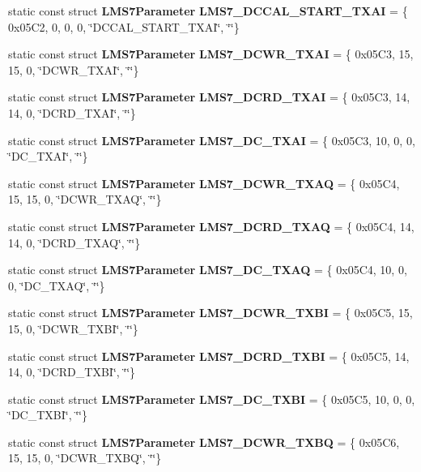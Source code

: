 \begin{DoxyCompactItemize}
\item 
static const struct {\bf L\+M\+S7\+Parameter} {\bf L\+M\+S7\+\_\+\+D\+C\+C\+A\+L\+\_\+\+S\+T\+A\+R\+T\+\_\+\+T\+X\+AI} = \{ 0x05\+C2, 0, 0, 0, \char`\"{}\+D\+C\+C\+A\+L\+\_\+\+S\+T\+A\+R\+T\+\_\+\+T\+X\+A\+I\char`\"{}, \char`\"{}\char`\"{}\}
\item 
static const struct {\bf L\+M\+S7\+Parameter} {\bf L\+M\+S7\+\_\+\+D\+C\+W\+R\+\_\+\+T\+X\+AI} = \{ 0x05\+C3, 15, 15, 0, \char`\"{}\+D\+C\+W\+R\+\_\+\+T\+X\+A\+I\char`\"{}, \char`\"{}\char`\"{}\}
\item 
static const struct {\bf L\+M\+S7\+Parameter} {\bf L\+M\+S7\+\_\+\+D\+C\+R\+D\+\_\+\+T\+X\+AI} = \{ 0x05\+C3, 14, 14, 0, \char`\"{}\+D\+C\+R\+D\+\_\+\+T\+X\+A\+I\char`\"{}, \char`\"{}\char`\"{}\}
\item 
static const struct {\bf L\+M\+S7\+Parameter} {\bf L\+M\+S7\+\_\+\+D\+C\+\_\+\+T\+X\+AI} = \{ 0x05\+C3, 10, 0, 0, \char`\"{}\+D\+C\+\_\+\+T\+X\+A\+I\char`\"{}, \char`\"{}\char`\"{}\}
\item 
static const struct {\bf L\+M\+S7\+Parameter} {\bf L\+M\+S7\+\_\+\+D\+C\+W\+R\+\_\+\+T\+X\+AQ} = \{ 0x05\+C4, 15, 15, 0, \char`\"{}\+D\+C\+W\+R\+\_\+\+T\+X\+A\+Q\char`\"{}, \char`\"{}\char`\"{}\}
\item 
static const struct {\bf L\+M\+S7\+Parameter} {\bf L\+M\+S7\+\_\+\+D\+C\+R\+D\+\_\+\+T\+X\+AQ} = \{ 0x05\+C4, 14, 14, 0, \char`\"{}\+D\+C\+R\+D\+\_\+\+T\+X\+A\+Q\char`\"{}, \char`\"{}\char`\"{}\}
\item 
static const struct {\bf L\+M\+S7\+Parameter} {\bf L\+M\+S7\+\_\+\+D\+C\+\_\+\+T\+X\+AQ} = \{ 0x05\+C4, 10, 0, 0, \char`\"{}\+D\+C\+\_\+\+T\+X\+A\+Q\char`\"{}, \char`\"{}\char`\"{}\}
\item 
static const struct {\bf L\+M\+S7\+Parameter} {\bf L\+M\+S7\+\_\+\+D\+C\+W\+R\+\_\+\+T\+X\+BI} = \{ 0x05\+C5, 15, 15, 0, \char`\"{}\+D\+C\+W\+R\+\_\+\+T\+X\+B\+I\char`\"{}, \char`\"{}\char`\"{}\}
\item 
static const struct {\bf L\+M\+S7\+Parameter} {\bf L\+M\+S7\+\_\+\+D\+C\+R\+D\+\_\+\+T\+X\+BI} = \{ 0x05\+C5, 14, 14, 0, \char`\"{}\+D\+C\+R\+D\+\_\+\+T\+X\+B\+I\char`\"{}, \char`\"{}\char`\"{}\}
\item 
static const struct {\bf L\+M\+S7\+Parameter} {\bf L\+M\+S7\+\_\+\+D\+C\+\_\+\+T\+X\+BI} = \{ 0x05\+C5, 10, 0, 0, \char`\"{}\+D\+C\+\_\+\+T\+X\+B\+I\char`\"{}, \char`\"{}\char`\"{}\}
\item 
static const struct {\bf L\+M\+S7\+Parameter} {\bf L\+M\+S7\+\_\+\+D\+C\+W\+R\+\_\+\+T\+X\+BQ} = \{ 0x05\+C6, 15, 15, 0, \char`\"{}\+D\+C\+W\+R\+\_\+\+T\+X\+B\+Q\char`\"{}, \char`\"{}\char`\"{}\}

\end{DoxyCompactItemize}
